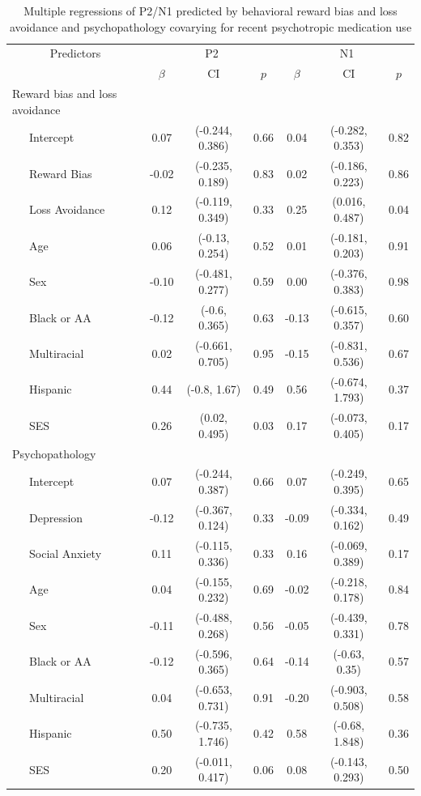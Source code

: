 \documentclass[english,man,floatsintext]{apa6}
\begin{document}
\begin{table}[tbp]

\begin{center}
\begin{threeparttable}

\caption{\label{tab:unnamed-chunk-10}Multiple regressions of P2/N1 predicted by behavioral reward bias and loss avoidance and psychopathology covarying for recent psychotropic medication use}

\begin{tabular}{lcccccc}
\toprule
 \multicolumn{1}{c}{Predictors} & \multicolumn{3}{c}{P2} & \multicolumn{3}{c}{N1} \\
\cmidrule(r){1-1} \cmidrule(r){2-4} \cmidrule(r){5-7}
  & $\beta$ & CI & $p$ & $\beta$ & CI & $p$\\
\midrule
Reward bias and loss avoidance &  &  &  &  &  & \\
\ \ \ Intercept & 0.07 & (-0.244, 0.386) & 0.66 & 0.04 & (-0.282, 0.353) & 0.82\\
\ \ \ Reward Bias & -0.02 & (-0.235, 0.189) & 0.83 & 0.02 & (-0.186, 0.223) & 0.86\\
\ \ \ Loss Avoidance & 0.12 & (-0.119, 0.349) & 0.33 & 0.25 & (0.016, 0.487) & 0.04\\
\ \ \ Age & 0.06 & (-0.13, 0.254) & 0.52 & 0.01 & (-0.181, 0.203) & 0.91\\
\ \ \ Sex & -0.10 & (-0.481, 0.277) & 0.59 & 0.00 & (-0.376, 0.383) & 0.98\\
\ \ \ Black or AA & -0.12 & (-0.6, 0.365) & 0.63 & -0.13 & (-0.615, 0.357) & 0.60\\
\ \ \ Multiracial & 0.02 & (-0.661, 0.705) & 0.95 & -0.15 & (-0.831, 0.536) & 0.67\\
\ \ \ Hispanic & 0.44 & (-0.8, 1.67) & 0.49 & 0.56 & (-0.674, 1.793) & 0.37\\
\ \ \ SES & 0.26 & (0.02, 0.495) & 0.03 & 0.17 & (-0.073, 0.405) & 0.17\\
Psychopathology &  &  &  &  &  & \\
\ \ \ Intercept & 0.07 & (-0.244, 0.387) & 0.66 & 0.07 & (-0.249, 0.395) & 0.65\\
\ \ \ Depression & -0.12 & (-0.367, 0.124) & 0.33 & -0.09 & (-0.334, 0.162) & 0.49\\
\ \ \ Social Anxiety & 0.11 & (-0.115, 0.336) & 0.33 & 0.16 & (-0.069, 0.389) & 0.17\\
\ \ \ Age & 0.04 & (-0.155, 0.232) & 0.69 & -0.02 & (-0.218, 0.178) & 0.84\\
\ \ \ Sex & -0.11 & (-0.488, 0.268) & 0.56 & -0.05 & (-0.439, 0.331) & 0.78\\
\ \ \ Black or AA & -0.12 & (-0.596, 0.365) & 0.64 & -0.14 & (-0.63, 0.35) & 0.57\\
\ \ \ Multiracial & 0.04 & (-0.653, 0.731) & 0.91 & -0.20 & (-0.903, 0.508) & 0.58\\
\ \ \ Hispanic & 0.50 & (-0.735, 1.746) & 0.42 & 0.58 & (-0.68, 1.848) & 0.36\\
\ \ \ SES & 0.20 & (-0.011, 0.417) & 0.06 & 0.08 & (-0.143, 0.293) & 0.50\\
\bottomrule
\end{tabular}


\end{threeparttable}
\end{center}
\end{table}
\end{document}
